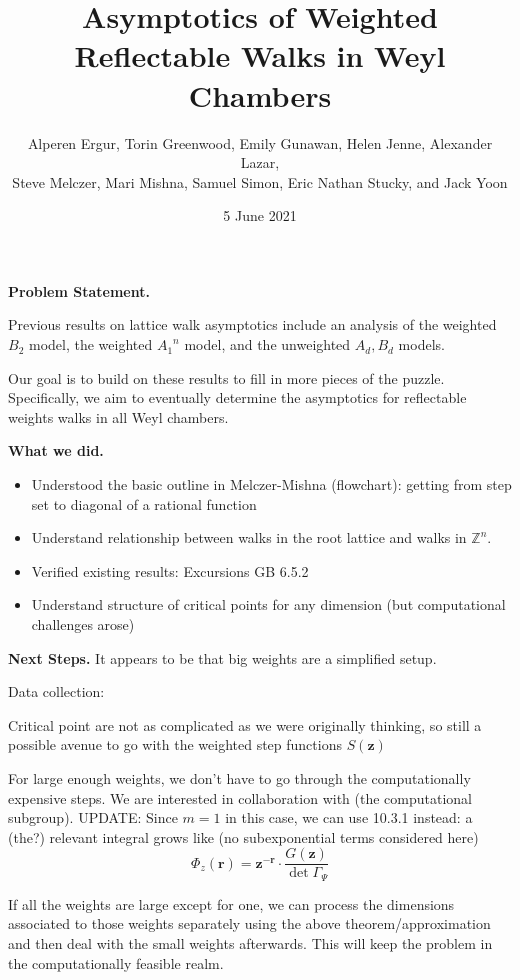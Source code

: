 \documentclass{article}
\title{Asymptotics of Weighted Reflectable Walks in Weyl Chambers}
\author{Alperen Ergur, Torin Greenwood, Emily Gunawan, Helen Jenne, Alexander Lazar, \\Steve Melczer, Mari Mishna, Samuel Simon,  Eric Nathan Stucky, and Jack Yoon}
\date{5 June 2021}
\begin{document}
\maketitle

\textbf{Problem Statement.}

Previous results on lattice walk asymptotics include an analysis of the weighted $B_2$ model, the weighted ${A_1}^n$ model, and the unweighted $A_d, B_d$ models. 

Our goal is to build on these results to fill in more pieces of the puzzle. Specifically, we aim to eventually determine the asymptotics for reflectable weights walks in all Weyl chambers. 

\textbf{What we did.}
\begin{itemize}
\item Understood the basic outline in Melczer-Mishna (flowchart): getting from step set to diagonal of a rational function
\item Understand relationship between walks in the root lattice and walks in $\mathbb{Z}^n$.
\item Verified existing results: Excursions GB 6.5.2
\item Understand structure of critical points for any dimension (but computational challenges arose)
\end{itemize}





\textbf{Next Steps.} It appears to be that big weights are a simplified setup.

Data collection:

Critical point are not as complicated as we were originally thinking, so still a possible avenue to go with the weighted step functions $S(\mathbf{z})$

For large enough weights, we don't have to go through the computationally expensive steps. %
We are interested in collaboration with (the computational subgroup).
%
UPDATE: Since $m=1$ in this case, we can use 10.3.1 instead: a (the?) relevant integral grows like (no subexponential terms considered here)
$$ \Phi_z(\mathbf{r}) = \mathbf{z}^{-\mathbf{r}}\cdot \frac{G(\mathbf{z})}{\det \Gamma_\Psi}$$


If all the weights are large except for one, we can process the dimensions associated to those weights separately using the above theorem/approximation and then deal with the small weights afterwards. This will keep the problem in the computationally feasible realm.
\end{document}
